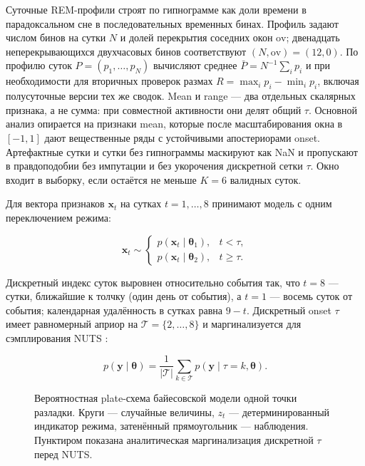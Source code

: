 Суточные REM-профили строят по гипнограмме как доли времени в парадоксальном сне в последовательных временных бинах. Профиль задают числом бинов на сутки \(N\) и долей перекрытия соседних окон \(\mathrm{ov}\); двенадцать неперекрывающихся двухчасовых бинов соответствуют \((N,\mathrm{ov})=(12,0)\). По профилю суток \(P=(p_1,\ldots,p_N)\) вычисляют среднее \(\bar P=N^{-1}\sum_i p_i\) и при необходимости для вторичных проверок размах \(R=\max_i p_i-\min_i p_i\), включая полусуточные версии тех же сводок. Mean и range — два отдельных скалярных признака, а не сумма: при совместной активности они делят общий \(\tau\). Основной анализ опирается на признаки mean, которые после масштабирования окна в \([-1,1]\) дают вещественные ряды с устойчивыми апостериорами onset. Артефактные сутки и сутки без гипнограммы маскируют как NaN и пропускают в правдоподобии без импутации и без укорочения дискретной сетки \(\tau\). Окно входит в выборку, если остаётся не меньше \(K=6\) валидных суток.

Для вектора признаков \(\mathbf{x}_t\) на сутках \(t=1,\ldots,8\) принимают модель с одним переключением режима:

\begin{equation*}
\mathbf{x}_t \sim
\begin{cases}
p(\mathbf{x}_t\mid\boldsymbol{\theta}_1), & t < \tau,\\
p(\mathbf{x}_t\mid\boldsymbol{\theta}_2), & t \ge \tau.
\end{cases}
\end{equation*}

Дискретный индекс суток выровнен относительно события так, что \(t=8\) — сутки, ближайшие к толчку (один день от события), а \(t=1\) — восемь суток от события; календарная удалённость в сутках равна \(9-t\). Дискретный onset \(\tau\) имеет равномерный априор на \(\mathcal{T}=\{2,\ldots,8\}\) и маргинализуется для сэмплирования NUTS \cite{HoffmanGelman2014}:

\begin{equation*}
p(\mathbf{y}\mid\boldsymbol{\theta})
=
\frac{1}{|\mathcal{T}|}
\sum_{k\in\mathcal{T}}
p(\mathbf{y}\mid\tau{=}k,\boldsymbol{\theta}).
\end{equation*}


\begin{figure}[t]
  \centering
  \resizebox{0.78\textwidth}{!}{}
  \caption{Вероятностная plate-схема байесовской модели одной точки разладки.
  Круги --- случайные величины, $z_t$ --- детерминированный индикатор режима, затенённый прямоугольник --- наблюдения.
  Пунктиром показана аналитическая маргинализация дискретной $\tau$ перед NUTS.}
  \label{fig:tau-model}
\end{figure}


